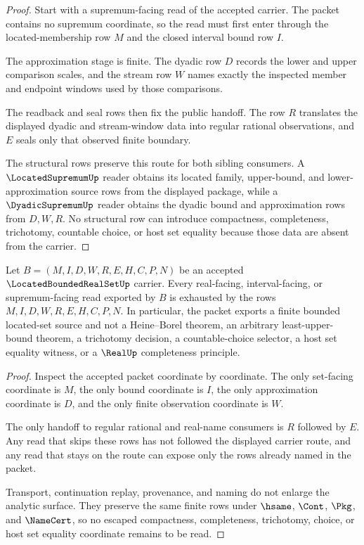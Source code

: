 \begin{proof}
Start with a supremum-facing read of the accepted carrier. The packet contains no supremum coordinate, so the read must first enter through the located-membership row $M$ and the closed interval bound row $I$.

The approximation stage is finite. The dyadic row $D$ records the lower and upper comparison scales, and the stream row $W$ names exactly the inspected member and endpoint windows used by those comparisons.

The readback and seal rows then fix the public handoff. The row $R$ translates the displayed dyadic and stream-window data into regular rational observations, and $E$ seals only that observed finite boundary.

The structural rows preserve this route for both sibling consumers. A $\LocatedSupremumUp$ reader obtains its located family, upper-bound, and lower-approximation source rows from the displayed package, while a $\DyadicSupremumUp$ reader obtains the dyadic bound and approximation rows from $D,W,R$. No structural row can introduce compactness, completeness, trichotomy, countable choice, or host set equality because those data are absent from the carrier.
\end{proof}

\begin{theorem}
\label{thm:located-bounded-real-set-nonescape}
Let $B=(M,I,D,W,R,E,H,C,P,N)$ be an accepted $\LocatedBoundedRealSetUp$ carrier. Every real-facing, interval-facing, or supremum-facing read exported by $B$ is exhausted by the rows $M,I,D,W,R,E,H,C,P,N$. In particular, the packet exports a finite bounded located-set source and not a Heine--Borel theorem, an arbitrary least-upper-bound theorem, a trichotomy decision, a countable-choice selector, a host set equality witness, or a $\RealUp$ completeness principle.
\end{theorem}

\begin{proof}
Inspect the accepted packet coordinate by coordinate. The only set-facing coordinate is $M$, the only bound coordinate is $I$, the only approximation coordinate is $D$, and the only finite observation coordinate is $W$.

The only handoff to regular rational and real-name consumers is $R$ followed by $E$. Any read that skips these rows has not followed the displayed carrier route, and any read that stays on the route can expose only the rows already named in the packet.

Transport, continuation replay, provenance, and naming do not enlarge the analytic surface. They preserve the same finite rows under $\hsame$, $\Cont$, $\Pkg$, and $\NameCert$, so no escaped compactness, completeness, trichotomy, choice, or host set equality coordinate remains to be read.
\end{proof}

